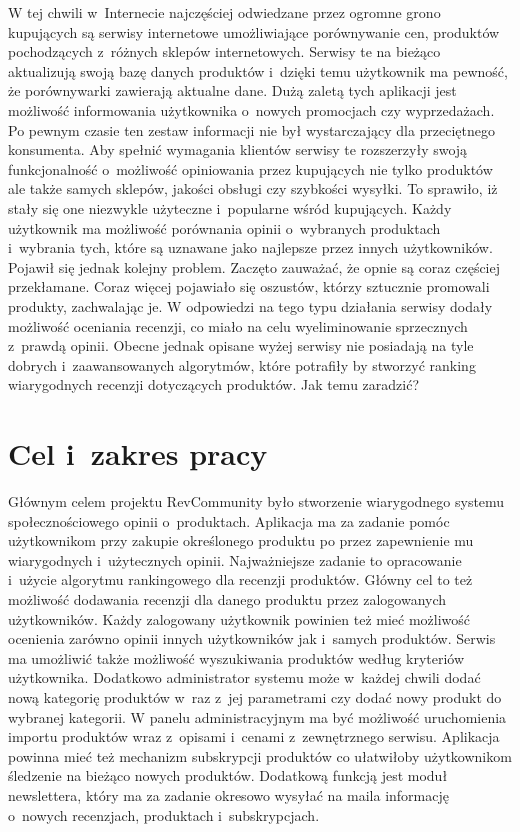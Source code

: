W tej chwili w~Internecie najczęściej odwiedzane przez ogromne grono kupujących są serwisy internetowe umożliwiające porównywanie cen, produktów pochodzących z~różnych sklepów internetowych. Serwisy te na bieżąco aktualizują swoją bazę danych produktów i~dzięki temu użytkownik ma pewność, że porównywarki zawierają aktualne dane. Dużą zaletą tych aplikacji jest możliwość informowania użytkownika o~nowych promocjach czy wyprzedażach. Po pewnym czasie ten zestaw informacji nie był wystarczający dla przeciętnego konsumenta. Aby spełnić wymagania klientów serwisy te rozszerzyły swoją funkcjonalność o~możliwość opiniowania przez kupujących nie tylko produktów ale także samych sklepów, jakości obsługi czy szybkości wysyłki. To sprawiło, iż stały się one niezwykle użyteczne i~popularne wśród kupujących. Każdy użytkownik ma możliwość porównania opinii o~wybranych produktach i~wybrania tych, które są uznawane jako najlepsze przez innych użytkowników. Pojawił się jednak kolejny problem. Zaczęto zauważać, że opnie są coraz częściej przekłamane. Coraz więcej pojawiało się oszustów, którzy sztucznie promowali produkty, zachwalając je. W odpowiedzi na tego typu działania serwisy dodały możliwość oceniania recenzji, co miało na celu wyeliminowanie sprzecznych z~prawdą opinii. Obecne jednak opisane wyżej serwisy nie posiadają na tyle dobrych i~zaawansowanych algorytmów, które potrafiły by stworzyć ranking wiarygodnych recenzji dotyczących produktów. Jak temu zaradzić?  
 


\section{Cel i~zakres pracy}
Głównym celem projektu RevCommunity było stworzenie wiarygodnego systemu społecznościowego opinii o~produktach. Aplikacja ma za zadanie pomóc użytkownikom przy zakupie określonego produktu po przez zapewnienie mu wiarygodnych i~użytecznych opinii. Najważniejsze zadanie to opracowanie i~użycie algorytmu rankingowego dla recenzji produktów. Główny cel to też możliwość dodawania recenzji dla danego produktu przez zalogowanych użytkowników. Każdy zalogowany użytkownik powinien też mieć możliwość ocenienia zarówno opinii innych użytkowników jak i~samych produktów. Serwis ma umożliwić także możliwość wyszukiwania produktów według kryteriów użytkownika. Dodatkowo administrator systemu może w~każdej chwili dodać nową kategorię produktów w~raz z~jej parametrami czy dodać nowy produkt do wybranej kategorii. W panelu administracyjnym ma być możliwość uruchomienia importu produktów wraz z~opisami i~cenami z~zewnętrznego serwisu. Aplikacja powinna mieć też mechanizm subskrypcji produktów co ułatwiłoby użytkownikom śledzenie na bieżąco nowych produktów. Dodatkową funkcją jest moduł newslettera, który ma za zadanie okresowo wysyłać na maila informację o~nowych recenzjach, produktach i~subskrypcjach. 


